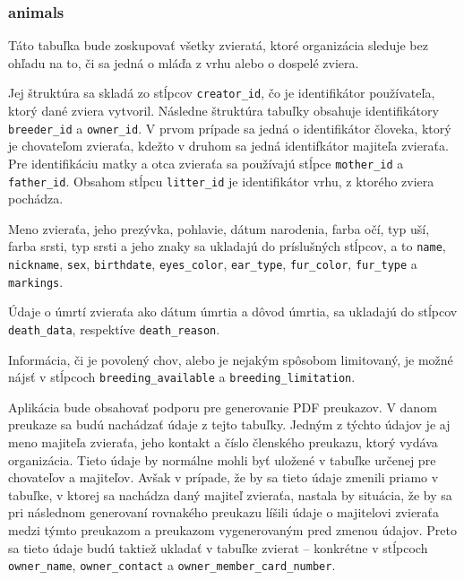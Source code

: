 \subsubsection*{animals}
Táto tabuľka bude zoskupovať všetky zvieratá, ktoré organizácia sleduje bez ohľadu na to, či sa jedná o mláďa z vrhu alebo o dospelé zviera. 

Jej štruktúra sa skladá zo stĺpcov \texttt{creator_id}, čo je identifikátor používateľa, ktorý dané zviera vytvoril. Následne štruktúra tabuľky obsahuje identifikátory \texttt{breeder_id} a \texttt{owner_id}. V prvom prípade sa jedná o identifikátor človeka, ktorý je chovateľom zvieraťa, kdežto v druhom sa jedná identifkátor majiteľa zvieraťa. Pre identifikáciu matky a otca zvieraťa sa používajú stĺpce \texttt{mother_id} a \texttt{father_id}. Obsahom stĺpcu \texttt{litter_id} je identifikátor vrhu, z ktorého zviera pochádza.

Meno zvieraťa, jeho prezývka, pohlavie, dátum narodenia, farba očí, typ uší, farba srsti, typ srsti a jeho znaky sa ukladajú do príslušných stĺpcov, a to  \texttt{name}, \texttt{nickname}, \texttt{sex}, \texttt{birthdate}, \texttt{eyes_color}, \texttt{ear_type}, \texttt{fur_color}, \texttt{fur_type} a \texttt{markings}.

Údaje o úmrtí zvieraťa ako dátum úmrtia a dôvod úmrtia, sa ukladajú do stĺpcov \texttt{death_data}, respektíve \texttt{death_reason}.

Informácia, či je povolený chov, alebo je nejakým spôsobom limitovaný, je možné nájsť v stĺpcoch \texttt{breeding_available} a \texttt{breeding_limitation}.

Aplikácia bude obsahovať podporu pre generovanie PDF preukazov. V danom preukaze sa budú nachádzať údaje z tejto tabuľky. Jedným z týchto údajov je aj meno majiteľa zvieraťa, jeho kontakt a číslo členského preukazu, ktorý vydáva organizácia. Tieto údaje by normálne mohli byť uložené v tabuľke určenej pre chovateľov a majiteľov. Avšak v prípade, že by sa tieto údaje zmenili priamo v tabuľke, v ktorej sa nachádza daný majiteľ zvieraťa, nastala by situácia, že by sa pri následnom generovaní rovnakého preukazu líšili údaje o majitelovi zvieraťa medzi týmto preukazom a preukazom vygenerovaným pred zmenou údajov.
Preto sa tieto údaje budú taktiež ukladať v tabuľke zvierat -- konkrétne v stĺpcoch \texttt{owner_name}, \texttt{owner_contact} a \texttt{owner_member_card_number}.

